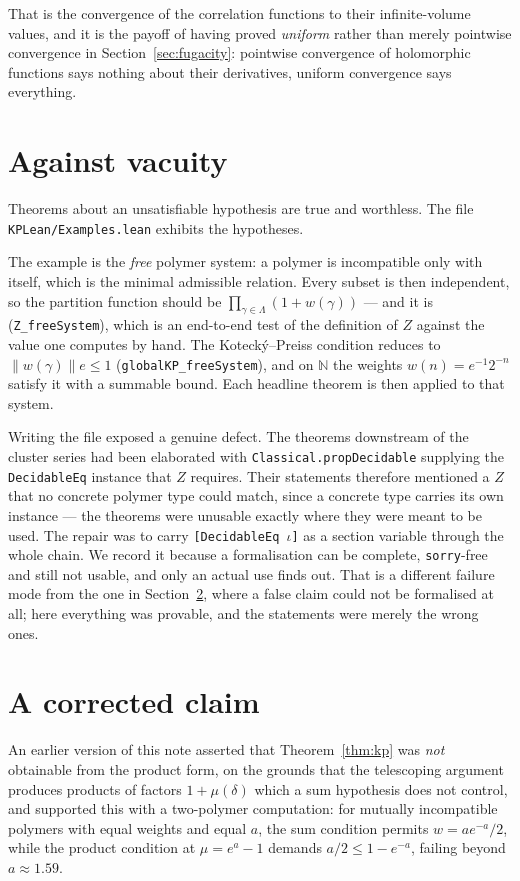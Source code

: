 \documentclass[11pt]{amsart}
\begin{document}
That is the convergence of the correlation functions to their
infinite-volume values, and it is the payoff of having proved
\emph{uniform} rather than merely pointwise convergence in
Section~\ref{sec:fugacity}: pointwise convergence of holomorphic
functions says nothing about their derivatives, uniform convergence says
everything.

\section{Against vacuity}\label{sec:examples}

Theorems about an unsatisfiable hypothesis are true and worthless. The
file \texttt{KPLean/Examples.lean} exhibits the hypotheses.

The example is the \emph{free} polymer system: a polymer is
incompatible only with itself, which is the minimal admissible relation.
Every subset is then independent, so the partition function should be
$\prod_{\gamma \in \Lambda} (1 + w(\gamma))$ --- and it is
(\texttt{Z\_freeSystem}), which is an end-to-end test of the definition
of $Z$ against the value one computes by hand. The Kotecký--Preiss
condition reduces to $\lVert w(\gamma)\rVert e \le 1$
(\texttt{globalKP\_freeSystem}), and on $\mathbb N$ the weights
$w(n) = e^{-1} 2^{-n}$ satisfy it with a summable bound. Each headline
theorem is then applied to that system.

Writing the file exposed a genuine defect. The theorems downstream of
the cluster series had been elaborated with \texttt{Classical.propDecidable}
supplying the \texttt{DecidableEq} instance that $Z$ requires. Their
statements therefore mentioned a $Z$ that no concrete polymer type could
match, since a concrete type carries its own instance --- the theorems
were unusable exactly where they were meant to be used. The repair was
to carry \texttt{[DecidableEq $\iota$]} as a section variable through
the whole chain. We record it because a formalisation can be complete,
\texttt{sorry}-free and still not usable, and only an actual use finds
out. That is a different failure mode from the one in
Section~\ref{sec:kp}, where a false claim could not be formalised at
all; here everything was provable, and the statements were merely the
wrong ones.

\section{A corrected claim}\label{sec:kp}

An earlier version of this note asserted that Theorem~\ref{thm:kp} was
\emph{not} obtainable from the product form, on the grounds that the
telescoping argument produces products of factors $1 + \mu(\delta)$ which a
sum hypothesis does not control, and supported this with a two-polymer
computation: for mutually incompatible polymers with equal weights and
equal $a$, the sum condition permits $w = a e^{-a}/2$, while the product
condition at $\mu = e^{a}-1$ demands $a/2 \le 1 - e^{-a}$, failing beyond
$a \approx 1.59$.
\end{document}
